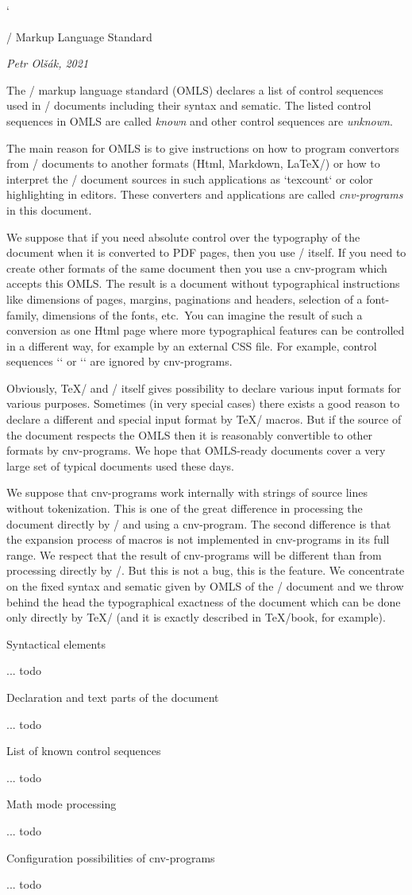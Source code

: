 \fontfam[lm]
\activettchar`
\enlang

\tit \OpTeX/ Markup Language Standard

{\it\hfil Petr Olšák, 2021}\bigskip

The \OpTeX/ markup language standard (OMLS) declares a list of control
sequences used in \OpTeX/ documents including their syntax and sematic. The
listed control sequences in OMLS are called {\it known} and other control
sequences are {\it unknown}.

The main reason for OMLS is to give instructions on how to program convertors
from \OpTeX/ documents to another formats (Html, Markdown, \LaTeX/) or how
to interpret the \OpTeX/ document sources in such applications as
`texcount` or color highlighting in editors. These converters and applications
are called {\it cnv-programs} in this document.

We suppose that if you need absolute control over the typography of the
document when it is converted to PDF pages, then you use \OpTeX/ itself. If
you need to create other formats of the same document then you use a
cnv-program which accepts this OMLS. The result is a document without
typographical instructions like dimensions of pages, margins, paginations
and headers, selection of a font-family, dimensions of the fonts, etc.\ You can
imagine the result of such a conversion as one Html page where more
typographical features can be controlled in a different way, for example by
an external CSS file. For example, control sequences `\fontfam` or
`\margins` are ignored by cnv-programs.

Obviously, \TeX/ and \OpTeX/ itself gives possibility to declare various
input formats for various purposes. Sometimes (in very special cases) there
exists a good reason to declare a different and special input format by
\TeX/ macros. But if the source of the document respects the OMLS then it is
reasonably convertible to other formats by cnv-programs. We hope that
OMLS-ready documents cover a very large set of typical documents used these
days.

We suppose that cnv-programs work internally with strings of source lines
without tokenization. This is one of the great difference in processing the
document directly by \OpTeX/ and using a cnv-program. The second difference is
that the expansion process of macros is not implemented in cnv-programs in
its full range. We respect that the result of cnv-programs will be different
than from processing directly by \OpTeX/. But this is not a bug, this is
the feature. We concentrate on the fixed syntax and sematic given by OMLS of the
\OpTeX/ document and we throw behind the head the typographical
exactness of the document which can be done only directly by \TeX/ (and it is
exactly described in \TeX/book, for example).

\sec Syntactical elements

... todo

\sec Declaration and text parts of the document

... todo

\sec List of known control sequences

... todo

\sec Math mode processing

... todo

\sec Configuration possibilities of cnv-programs

... todo

\bye
